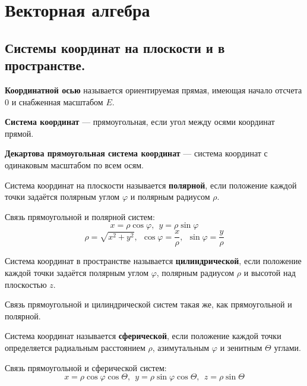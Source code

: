 

\usepackage{gensymb}
\usepackage{ulem}
\usepackage{sectsty}
\usepackage{tensor}

\subsectionfont{\fontsize{14}{15}\selectfont}
\setlength{\parindent}{0pt}
\setlength\arraycolsep{2pt}

\cfoot{}

\DeclarePairedDelimiter\Bracket{\lbrack}{\rbrack}

\newcommand{\doref}[1]{Дано выше. \textit{(\ref{#1}, стр. \pageref{#1})}}
\newcommand\Warning{%
 \makebox[1.4em][c]{%
 \makebox[0pt][c]{\raisebox{.1em}{\small!}}%
 \makebox[0pt][c]{\color{red}\Large$\bigtriangleup$}}}%


\section{Векторная алгебра}
\subsection{Системы координат на плоскости и в пространстве.}
\begin{definition}
    \textbf{Координатной осью} называется ориентируемая прямая, имеющая начало отсчета $0$ и снабженная масштабом $E$.
\end{definition}
\begin{definition}
    \textbf{Система координат} --- прямоугольная, если угол между осями координат прямой.
\end{definition}
\begin{definition}
    \textbf{Декартова прямоугольная система координат} --- система координат с одинаковым масштабом по всем осям.
\end{definition}
\begin{definition}
    Система координат на плоскости называется \textbf{полярной}, если положение каждой точки задаётся полярным углом $\varphi$ и полярным радиусом $\rho$.
\end{definition}
Связь прямоугольной и полярной систем:
$$x=\rho\cos\varphi,\ \ y=\rho\sin\varphi$$
$$\rho=\sqrt{x^2+y^2},\ \ \cos\varphi=\frac{x}{\rho},\ \ \sin\varphi=\frac{y}{\rho}$$
\begin{definition}
    Система координат в пространстве называется \textbf{цилиндрической}, если положение каждой точки задаётся полярным углом $\varphi$, полярным радиусом $\rho$ и высотой над плоскостью $z$.
\end{definition}
Связь прямоугольной и цилиндрической систем такая же, как прямоугольной и полярной.
\begin{definition}
    Система координат называется \textbf{сферической}, если положение каждой точки определяется радиальным расстоянием $\rho$, азимутальным $\varphi$ и зенитным $\Theta$ углами.
\end{definition}
Связь прямоугольной и сферической систем:
$$x=\rho\cos\varphi\cos\Theta, \ \ y=\rho\sin\varphi\cos\Theta, \ \ z=\rho\sin\Theta$$
